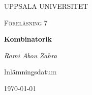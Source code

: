 \begin{titlepage}

  \centering
	{\scshape\LARGE UPPSALA UNIVERSITET\par}
	\vspace{1cm}
  {\scshape\Large {Föreläsning 7} \par}
	\vspace{1.5cm}
  {\huge\bfseries {Kombinatorik} \par}
	\vspace{2cm}
	{\Large\itshape Rami Abou Zahra \par}
	\vfill
  \vfill


  {\large Inlämningsdatum}\par
  {\today}

\end{titlepage}
